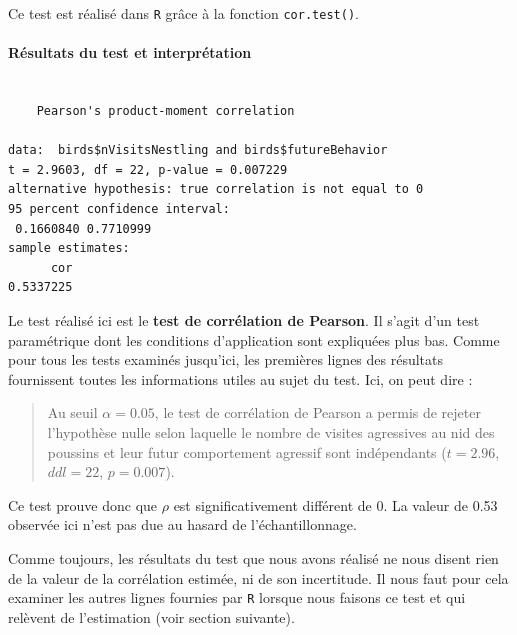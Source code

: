 \documentclass[
  a4paper,
]{article}
\newenvironment{Shaded}{\begin{snugshade}}{\end{snugshade}}
\newcommand{\KeywordTok}[1]{\textcolor[rgb]{0.12,0.11,0.11}{\textbf{#1}}}
\newcommand{\NormalTok}[1]{\textcolor[rgb]{0.12,0.11,0.11}{#1}}
\newcommand{\OperatorTok}[1]{\textcolor[rgb]{0.12,0.11,0.11}{#1}}
\begin{document}
Ce test est réalisé dans \texttt{R} grâce à la fonction \texttt{cor.test()}.

\hypertarget{ruxe9sultats-du-test-et-interpruxe9tation}{%
\paragraph{Résultats du test et interprétation}\label{ruxe9sultats-du-test-et-interpruxe9tation}}

\begin{Shaded}
\end{Shaded}

\begin{verbatim}

    Pearson's product-moment correlation

data:  birds$nVisitsNestling and birds$futureBehavior
t = 2.9603, df = 22, p-value = 0.007229
alternative hypothesis: true correlation is not equal to 0
95 percent confidence interval:
 0.1660840 0.7710999
sample estimates:
      cor 
0.5337225 
\end{verbatim}

Le test réalisé ici est le \textbf{test de corrélation de Pearson}. Il s'agit d'un test paramétrique dont les conditions d'application sont expliquées plus bas. Comme pour tous les tests examinés jusqu'ici, les premières lignes des résultats fournissent toutes les informations utiles au sujet du test. Ici, on peut dire :

\begin{quote}
Au seuil \(\alpha = 0.05\), le test de corrélation de Pearson a permis de rejeter l'hypothèse nulle selon laquelle le nombre de visites agressives au nid des poussins et leur futur comportement agressif sont indépendants (\(t = 2.96\), \(ddl = 22\), \(p = 0.007\)).
\end{quote}

Ce test prouve donc que \(\rho\) est significativement différent de 0. La valeur de 0.53 observée ici n'est pas due au hasard de l'échantillonnage.

Comme toujours, les résultats du test que nous avons réalisé ne nous disent rien de la valeur de la corrélation estimée, ni de son incertitude. Il nous faut pour cela examiner les autres lignes fournies par \texttt{R} lorsque nous faisons ce test et qui relèvent de l'estimation (voir section suivante).
\end{document}
